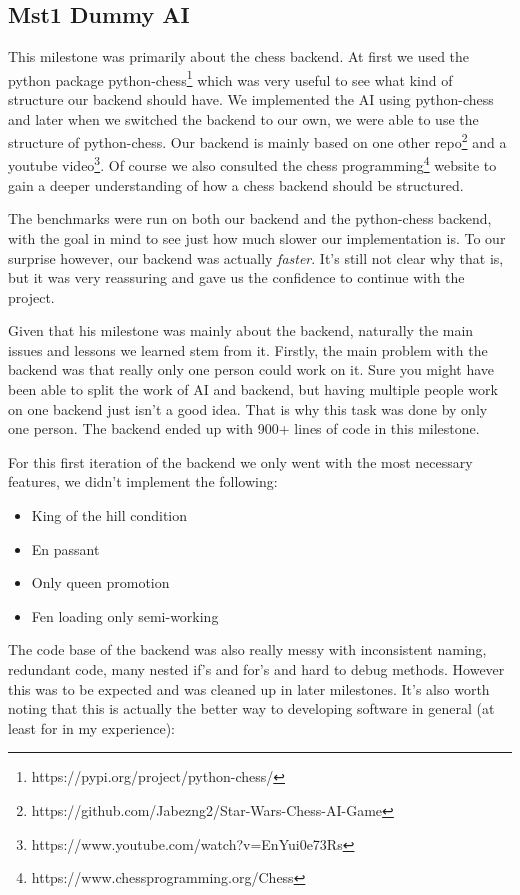 \pagebreak

\subsection{Mst1 Dummy AI}

This milestone was primarily about the chess backend.
At first we used the python package
python-chess\footnote{https://pypi.org/project/python-chess/}
which was very useful to see what kind of structure our backend should have.
We implemented the AI using python-chess and later when we switched the backend to our own,
we were able to use the structure of python-chess.
Our backend is mainly based on one other
repo\footnote{https://github.com/Jabezng2/Star-Wars-Chess-AI-Game}
and a youtube
video\footnote{https://www.youtube.com/watch?v=EnYui0e73Rs}.
Of course we also consulted the chess
programming\footnote{https://www.chessprogramming.org/Chess}
website to gain a deeper understanding of how a chess backend should be structured.

The benchmarks were run on both our backend and the python-chess backend,
with the goal in mind to see just how much slower our implementation is.
To our surprise however, our backend was actually \textit{faster}.
It's still not clear why that is, but it was very reassuring and gave us
the confidence to continue with the project.

Given that his milestone was mainly about the backend,
naturally the main issues and lessons we learned stem from
it. Firstly, the main problem with the backend was that really
only one person could work on it. Sure you might have been
able to split the work of AI and backend, but having multiple
people work on one backend just isn't a good idea.
That is why this task was done by only one person.
The backend ended up with 900+ lines of code in this milestone.

For this first iteration of the backend we only went with the most
necessary features, we didn't implement the following:

\begin{itemize}
  \item{King of the hill condition}
  \item{En passant}
  \item{Only queen promotion}
  \item{Fen loading only semi-working}
\end{itemize}

The code base of the backend was also really messy with
inconsistent naming, redundant code, many nested if's and for's
and hard to debug methods. However this was to be expected
and was cleaned up in later milestones. It's also worth
noting that this is actually the better way to developing
software in general (at least for in my experience):

